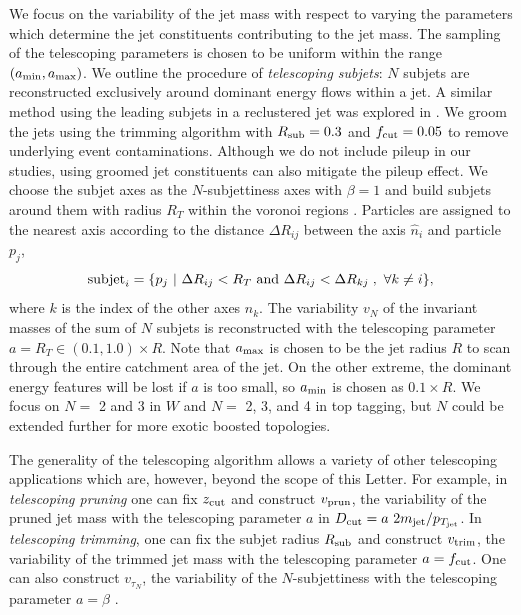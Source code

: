 \documentclass[aps,prl,floatfix,preprintnumbers,twocolumn,groupedaddress,nofootinbib]{revtex4-1}
\begin{document}
We focus on the variability of the jet mass with respect to varying the parameters which determine the jet constituents contributing to the jet mass. The sampling of the telescoping parameters is chosen to be uniform within the range $(a_{\rm min},a_{\rm max})$. We outline the procedure of \textit{telescoping subjets}: $N$ subjets are reconstructed exclusively around dominant energy flows within a jet. A similar method using the leading subjets in a reclustered jet was explored in \cite{Cui:2010km}. We groom the jets using the trimming algorithm with $R_{\rm sub}=0.3$ and $f_{\rm cut}=0.05$ to remove underlying event contaminations. Although we do not include pileup in our studies, using groomed jet constituents can also mitigate the pileup effect. We choose the subjet axes as the $N$-subjettiness axes \cite{Thaler:2011gf} with $\beta = 1$ and build subjets around them with radius $R_T$ within the voronoi regions \cite{Stewart:2010tn,Chien:2013kca,Stewart:2015waa,Thaler:2015xaa}. Particles are assigned to the nearest axis according to the distance $\Delta R_{ij}$ between the axis $\hat n_i$ and particle $p_j$,
\begin{equation}
    {\rm subjet}_{i} = \{p_j~|~\Delta R_{ij}<R_T~{\rm and}~\Delta R_{ij}<\Delta R_{kj}\;,~\forall k\neq i\},
\end{equation}
where $k$ is the index of the other axes $\hat n_k$. The variability $v_N$ of the invariant masses of the sum of $N$ subjets is reconstructed with the telescoping parameter $a = R_{T}\in (0.1, 1.0)\times R$. Note that $a_{\rm max}$ is chosen to be the jet radius $R$ to scan through the entire catchment area of the jet. On the other extreme, the dominant energy features will be lost if $a$ is too small, so $a_{\rm min}$ is chosen as $0.1\times R$. We focus on $N = $ 2 and 3 in $W$ and $N = $ 2, 3, and 4 in top tagging, but $N$ could be extended further for more exotic boosted topologies. 

The generality of the telescoping algorithm allows a variety of other telescoping applications which are, however, beyond the scope of this Letter. For example, in \textit{telescoping pruning} one can fix $z_{\rm cut}$ and construct $v_{\rm prun}$, the variability of the pruned jet mass with the telescoping parameter $a$ in $D_{\rm cut} = a~ 2m_{\rm jet}/p_{T_{\rm jet}}$. In
\textit{telescoping trimming}, one can fix the subjet radius $R_{\rm sub}$ and construct $v_{\rm trim}$, the variability of the trimmed jet mass with the telescoping parameter $a = f_{\rm cut}$. One can also construct $v_{\tau_N}$, the variability of the $N$-subjettiness with the telescoping parameter $a = \beta$ \cite{Thaler:2010tr}. 
\end{document}
